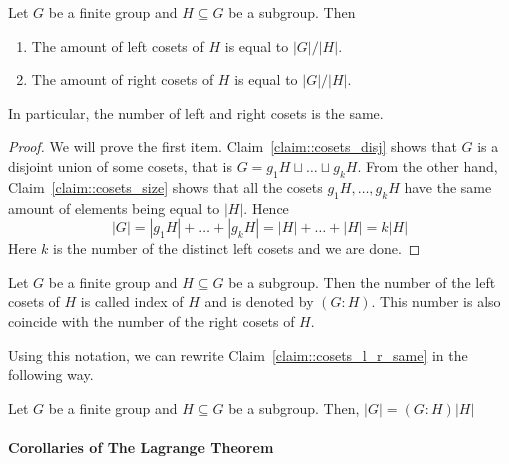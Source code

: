 \begin{claim}
\label{claim::cosets_l_r_same}
Let $G$ be a finite group and $H\subseteq G$ be a subgroup.
Then
\begin{enumerate}
\item The amount of left cosets of $H$ is equal to $|G|/|H|$.

\item The amount of right cosets of $H$ is equal to $|G|/|H|$.
\end{enumerate}
In particular, the number of left and right cosets is the same.
\end{claim}
\begin{proof}
We will prove the first item.
Claim~\ref{claim::cosets_disj} shows that $G$ is a disjoint union of some cosets, that is $G = g_1 H \sqcup \ldots \sqcup g_k H$.
From the other hand, Claim~\ref{claim::cosets_size} shows that all the cosets $g_1H,\ldots, g_kH$ have the same amount of elements being equal to $|H|$.
Hence 
\[
|G| = |g_1H| + \ldots +|g_k H| = |H| + \ldots + |H| = k |H|
\]
Here $k$ is the number of the distinct left cosets and we are done.
\end{proof}

\begin{definition}
Let $G$ be a finite group and $H\subseteq G$ be a subgroup.
Then the number of the left cosets of $H$ is called index of $H$ and is denoted by $(G:H)$.
This number is also coincide with the number of the right cosets of $H$.
\end{definition}

Using this notation, we can rewrite Claim~\ref{claim::cosets_l_r_same} in the following way.

\begin{claim}
Let $G$ be a finite group and $H\subseteq G$ be a subgroup.
Then, $|G| = (G : H)|H|$
\end{claim}


\paragraph{Corollaries of The Lagrange Theorem}


